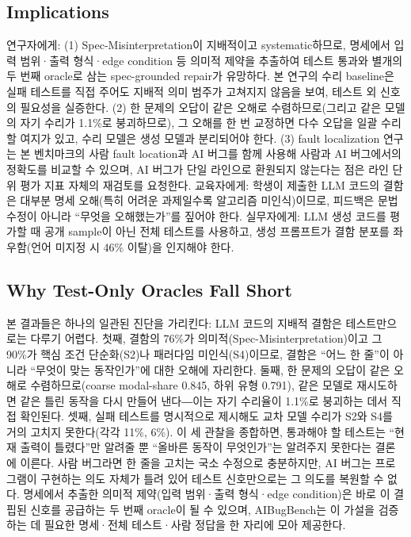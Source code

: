 \documentclass[10pt,conference]{IEEEtran}
\begin{document}
\subsection{Implications}
연구자에게: (1) Spec-Misinterpretation이 지배적이고 systematic하므로, 명세에서 입력 범위·출력 형식·edge condition 등 의미적 제약을 추출하여 테스트 통과와 별개의 두 번째 oracle로 삼는 spec-grounded repair가 유망하다. 본 연구의 수리 baseline은 실패 테스트를 직접 주어도 지배적 의미 범주가 고쳐지지 않음을 보여, 테스트 외 신호의 필요성을 실증한다. (2) 한 문제의 오답이 같은 오해로 수렴하므로(그리고 같은 모델의 자기 수리가 1.1\%로 붕괴하므로), 그 오해를 한 번 교정하면 다수 오답을 일괄 수리할 여지가 있고, 수리 모델은 생성 모델과 분리되어야 한다. (3) fault localization 연구는 본 벤치마크의 사람 fault location과 AI 버그를 함께 사용해 사람과 AI 버그에서의 정확도를 비교할 수 있으며, AI 버그가 단일 라인으로 환원되지 않는다는 점은 라인 단위 평가 지표 자체의 재검토를 요청한다. 교육자에게: 학생이 제출한 LLM 코드의 결함은 대부분 명세 오해(특히 어려운 과제일수록 알고리즘 미인식)이므로, 피드백은 문법 수정이 아니라 ``무엇을 오해했는가''를 짚어야 한다. 실무자에게: LLM 생성 코드를 평가할 때 공개 sample이 아닌 전체 테스트를 사용하고, 생성 프롬프트가 결함 분포를 좌우함(언어 미지정 시 46\% 이탈)을 인지해야 한다.

\subsection{Why Test-Only Oracles Fall Short}
본 결과들은 하나의 일관된 진단을 가리킨다: LLM 코드의 지배적 결함은 테스트만으로는 다루기 어렵다. 첫째, 결함의 76\%가 의미적(Spec-Misinterpretation)이고 그 90\%가 핵심 조건 단순화(S2)나 패러다임 미인식(S4)이므로, 결함은 ``어느 한 줄''이 아니라 ``무엇이 맞는 동작인가''에 대한 오해에 자리한다. 둘째, 한 문제의 오답이 같은 오해로 수렴하므로(coarse modal-share 0.845, 하위 유형 0.791), 같은 모델로 재시도하면 같은 틀린 동작을 다시 만들어 낸다―이는 자기 수리율이 1.1\%로 붕괴하는 데서 직접 확인된다. 셋째, 실패 테스트를 명시적으로 제시해도 교차 모델 수리가 S2와 S4를 거의 고치지 못한다(각각 11\%, 6\%). 이 세 관찰을 종합하면, 통과해야 할 테스트는 ``현재 출력이 틀렸다''만 알려줄 뿐 ``올바른 동작이 무엇인가''는 알려주지 못한다는 결론에 이른다. 사람 버그라면 한 줄을 고치는 국소 수정으로 충분하지만, AI 버그는 프로그램이 구현하는 의도 자체가 틀려 있어 테스트 신호만으로는 그 의도를 복원할 수 없다. 명세에서 추출한 의미적 제약(입력 범위·출력 형식·edge condition)은 바로 이 결핍된 신호를 공급하는 두 번째 oracle이 될 수 있으며, AIBugBench는 이 가설을 검증하는 데 필요한 명세·전체 테스트·사람 정답을 한 자리에 모아 제공한다.
\end{document}
